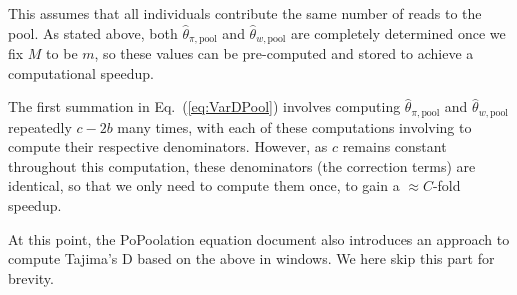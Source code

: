 \documentclass[a4paper,fontsize=9pt,DIV=14]{scrartcl}
\newcounter{todo}
\newcommand\todo[1]{}
\newcommand\eqnref[1]{Eq.~(\ref{#1})}
\begin{document}
This assumes that all individuals contribute the same number of reads to the pool.
As stated above, both $\widehat{\theta}_{\pi,\text{pool}}$ and $\widehat{\theta}_{w, \text{pool}}$ are completely determined once we fix $M$ to be $m$, so these values can be pre-computed and stored to achieve a computational speedup.

The first summation in \eqnref{eq:VarDPool} involves computing $\widehat{\theta}_{\pi,\text{pool}}$ and 
$\widehat{\theta}_{w,\text{pool}}$ repeatedly $c-2b$ many times, 
with each of these computations involving to compute their respective denominators.
However, as $c$ remains constant throughout this computation, these denominators (the correction terms)
are identical, so that we only need to compute them once, to gain a $\approx C$-fold speedup.

At this point, the PoPoolation equation document also introduces an approach to compute Tajima's D based on the above in windows.
We here skip this part for brevity.




\end{document}
